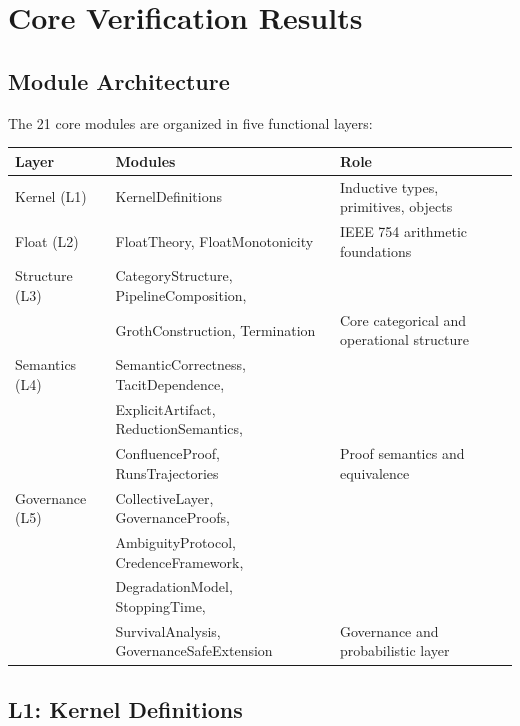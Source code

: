 \section{Core Verification Results}
\label{ch:core}

\subsection{Module Architecture}

The 21 core modules are organized in five functional layers:

\begin{center}
\begin{tabular}{lll}
\toprule
Layer & Modules & Role \\
\midrule
Kernel (L1) & KernelDefinitions & Inductive types, primitives, objects \\
Float (L2) & FloatTheory, FloatMonotonicity & IEEE 754 arithmetic foundations \\
Structure (L3) & CategoryStructure, PipelineComposition, & \\
 & GrothConstruction, Termination & Core categorical and operational structure \\
Semantics (L4) & SemanticCorrectness, TacitDependence, & \\
 & ExplicitArtifact, ReductionSemantics, & \\
 & ConfluenceProof, RunsTrajectories & Proof semantics and equivalence \\
Governance (L5) & CollectiveLayer, GovernanceProofs, & \\
 & AmbiguityProtocol, CredenceFramework, & \\
 & DegradationModel, StoppingTime, & \\
 & SurvivalAnalysis, GovernanceSafeExtension & Governance and probabilistic layer \\
\bottomrule
\end{tabular}
\end{center}

\subsection{L1: Kernel Definitions}

